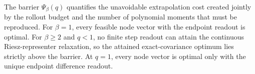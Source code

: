 The barrier \(\Psi_\beta(q)\) quantifies the unavoidable extrapolation cost created jointly by the rollout budget and the number of polynomial moments that must be reproduced.  For \(\beta=1\), every feasible node vector with the endpoint readout is optimal.  For \(\beta\ge2\) and \(q<1\), no finite step readout can attain the continuous Riesz-representer relaxation, so the attained exact-covariance optimum lies strictly above the barrier.  At \(q=1\), every node vector is optimal only with the unique endpoint difference readout.